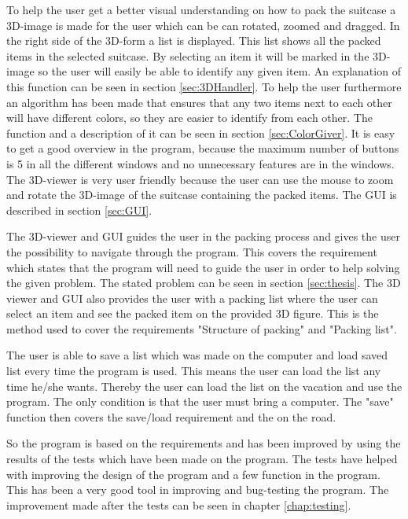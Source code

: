 To help the user get a better visual understanding on how to pack the suitcase a 3D-image is made for the user which can be can rotated, zoomed and dragged. In the right side of the 3D-form a list is displayed. This list shows all the packed items in the selected suitcase. By selecting an item it will be marked in the 3D-image so the user will easily be able to identify any given item. An explanation of this function can be seen in section \ref{sec:3DHandler}. To help the user furthermore an algorithm has been made that ensures that any two items next to each other will have different colors, so they are easier to identify from each other. The function and a description of it can be seen in section \ref{sec:ColorGiver}.
It is easy to get a good overview in the program, because the maximum number of buttons is 5 in all the different windows and no unnecessary features are in the windows. The 3D-viewer is very user friendly because the user can use the mouse to zoom and rotate the 3D-image of the suitcase containing the packed items. The GUI is described in section \ref{sec:GUI}.

The 3D-viewer and GUI guides the user in the packing process and gives the user the possibility to navigate through the program. This covers the requirement which states that the program will need to guide the user in order to help solving the given problem. The stated problem can be seen in section \ref{sec:thesis}. The 3D viewer and GUI also provides the user with a packing list where the user can select an item and see the packed item on the provided 3D figure. This is the method used to cover the requirements "Structure of packing" and "Packing list".

The user is able to save a list which was made on the computer and load saved list every time the program is used. This means the user can load the list any time he/she wants. Thereby the user can load the list on the vacation and use the program. The only condition is that the user must bring a computer. The "save" function then covers the save/load requirement and the on the road.

So the program is based on the requirements and has been improved by using the results of the tests which have been made on the program. The tests have helped with improving the design of the program and a few function in the program. This has been a very good tool in improving and bug-testing the program. The improvement made after the tests can be seen in chapter \ref{chap:testing}.

